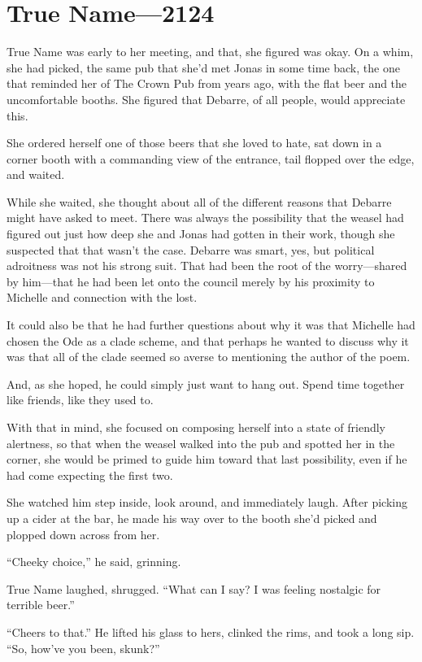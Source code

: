 \hypertarget{true-name-2124}{%
\chapter{True Name—2124}\label{true-name-2124}}

True Name was early to her meeting, and that, she figured was okay. On a whim, she had picked, the same pub that she'd met Jonas in some time back, the one that reminded her of The Crown Pub from years ago, with the flat beer and the uncomfortable booths. She figured that Debarre, of all people, would appreciate this.

She ordered herself one of those beers that she loved to hate, sat down in a corner booth with a commanding view of the entrance, tail flopped over the edge, and waited.

While she waited, she thought about all of the different reasons that Debarre might have asked to meet. There was always the possibility that the weasel had figured out just how deep she and Jonas had gotten in their work, though she suspected that that wasn't the case. Debarre was smart, yes, but political adroitness was not his strong suit. That had been the root of the worry---shared by him---that he had been let onto the council merely by his proximity to Michelle and connection with the lost.

It could also be that he had further questions about why it was that Michelle had chosen the Ode as a clade scheme, and that perhaps he wanted to discuss why it was that all of the clade seemed so averse to mentioning the author of the poem.

And, as she hoped, he could simply just want to hang out. Spend time together like friends, like they used to.

With that in mind, she focused on composing herself into a state of friendly alertness, so that when the weasel walked into the pub and spotted her in the corner, she would be primed to guide him toward that last possibility, even if he had come expecting the first two.

She watched him step inside, look around, and immediately laugh. After picking up a cider at the bar, he made his way over to the booth she'd picked and plopped down across from her.

``Cheeky choice,'' he said, grinning.

True Name laughed, shrugged. ``What can I say? I was feeling nostalgic for terrible beer.''

``Cheers to that.'' He lifted his glass to hers, clinked the rims, and took a long sip. ``So, how've you been, skunk?''

